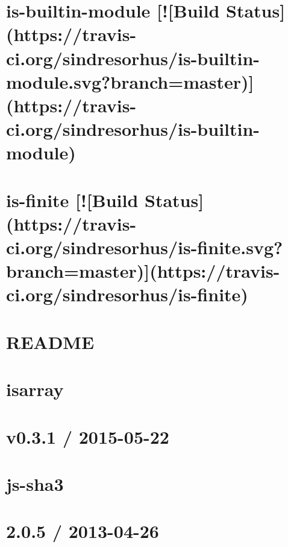 \documentclass[twoside]{book}
\newcommand{\+}{\discretionary{\mbox{\scriptsize$\hookleftarrow$}}{}{}}
\begin{document}
\chapter{is-\/builtin-\/module \mbox{[}!\mbox{[}Build Status\mbox{]}(https\+://travis-\/ci.org/sindresorhus/is-\/builtin-\/module.svg?branch=master)\mbox{]}(https\+://travis-\/ci.org/sindresorhus/is-\/builtin-\/module)}
\label{md_app_web_node_modules_is-builtin-module_readme}

\chapter{is-\/finite \mbox{[}!\mbox{[}Build Status\mbox{]}(https\+://travis-\/ci.org/sindresorhus/is-\/finite.svg?branch=master)\mbox{]}(https\+://travis-\/ci.org/sindresorhus/is-\/finite)}
\label{md_app_web_node_modules_is-finite_readme}

\chapter{R\+E\+A\+D\+ME}
\label{md_app_web_node_modules_is-utf8__r_e_a_d_m_e}

\chapter{isarray}
\label{md_app_web_node_modules_isarray__r_e_a_d_m_e}

\chapter{v0.3.1 / 2015-\/05-\/22}
\label{md_app_web_node_modules_js-sha3__c_h_a_n_g_e_l_o_g}

\chapter{js-\/sha3}
\label{md_app_web_node_modules_js-sha3__r_e_a_d_m_e}

\chapter{2.0.5 / 2013-\/04-\/26}
\label{md_app_web_node_modules_js-yaml__h_i_s_t_o_r_y}

\end{document}
